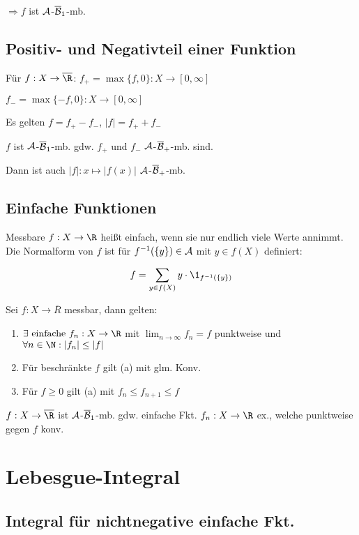 $\Rightarrow f$ ist $\mathcal{A}$-$\overline{\mathcal{B}}_1$-mb.

\subsection*{Positiv- und Negativteil einer Funktion}

Für $f : X \to \overline \R$: $f_+ = \max\{f,0\} : X \to [0, \infty]$

\hspace{20.1mm} $f_- = \max\{-f,0\} : X \to [0, \infty]$

Es gelten $f = f_+ - f_-$, $|f| = f_+ + f_-$

$f$ ist $\mathcal{A}$-$\overline{\mathcal{B}}_1$-mb. gdw. $f_+$ und $f_-$ $\mathcal{A}$-$\overline{\mathcal{B}}_+$-mb. sind.

Dann ist auch $|f| : x \mapsto |f(x)|$ $\mathcal{A}$-$\overline{\mathcal{B}}_+$-mb.

\subsection*{Einfache Funktionen}

Messbare $f : X \to \R$ heißt einfach, wenn sie nur endlich viele Werte annimmt. Die Normalform von $f$ ist für $f^{-1}(\{y\}) \in \mathcal{A}$ mit $y \in f(X)$ definiert:

\vspace{-2mm}
\[ f = \sum_{y \in f(X)} y \cdot \1_{f^{-1}(\{y\})} \]

Sei $f : X \to \overline R$ messbar, dann gelten:

\begin{enumerate}[label=(\alph*)]
	\item $\exists \text{ einfache } f_n : X \to \R$ mit $\lim_{n \to \infty} f_n = f$ punktweise und $\forall n \in \N : |f_n| \leq |f|$
	\item Für beschränkte $f$ gilt (a) mit glm. Konv.
	\item Für $f \geq 0$ gilt (a) mit $f_n \leq f_{n+1} \leq f$
\end{enumerate}

$f : X \to \overline\R$ ist $\mathcal{A}$-$\overline{\mathcal{B}}_1$-mb. gdw. einfache Fkt. $f_n : X \to \R$ ex., welche punktweise gegen $f$ konv.

\section*{Lebesgue-Integral}

\subsection*{Integral für nichtnegative einfache Fkt.}

